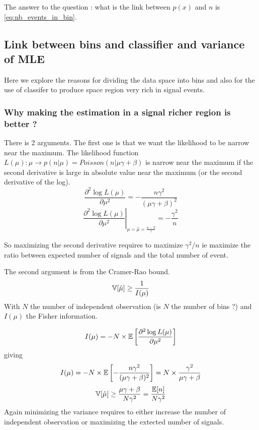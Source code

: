 The answer to the question : what is the link between $p(x)$ and $n$ is \autoref{eq:nb_events_in_bin}.





\subsection{Link between bins and classifier and variance of MLE} %
\label{sub:link_between_bins_and_classifier_and_variance_of_mle}

Here we explore the reasons for dividing the data space into bins and also for the use of classifer to produce space region very rich in signal events.


\subsubsection{Why making the estimation in a signal richer region is better ?}

There is 2 arguments.
The first one is that we want the likelihood to be narrow near the maximum.
The likelihood function $L(\mu) : \mu \to p(n|\mu) = Poisson(n|\mu\gamma + \beta)$ is narrow near the maximum if the second derivative is large in absolute value near the maximum (or the second derivative of the log).
\begin{equation}
    \frac{\partial^2 \log L(\mu)}{\partial \mu^2} = -\frac{n \gamma^2}{(\mu\gamma + \beta)^2}
\end{equation}
\begin{equation}
    \left . \frac{\partial^2 \log L(\mu)}{\partial \mu^2}  \right |_{\mu=\hat \mu = \frac{n-\beta}{\gamma}} = -\frac{\gamma^2}{n}
\end{equation}

So maximizing the second derivative requires to maximize $\gamma^2 / n$ ie maximize the ratio between expected number of signals and the total number of event.

The second argument is from the Cramer-Rao bound\needcite.
\begin{equation}
    \mathbb{V}[\hat \mu] \geq \frac{1}{I(\mu)}
\end{equation}
With $N$ the number of independent observation (is $N$ the number of bins ?) and $I(\mu)$ the Fisher information.

\begin{equation}
    I(\mu) = - N \times \mathbb{E}\left [\frac{\partial^2 \log L(\mu)}{\partial \mu^2} \right ]
\end{equation}
giving 
\begin{equation}
    I(\mu) = - N \times \mathbb{E}\left [-\frac{n \gamma^2}{(\mu\gamma + \beta)^2} \right ] = N \times \frac{\gamma^2}{\mu\gamma + \beta}
\end{equation}
\begin{equation}
    \mathbb{V}[\hat \mu] \geq  \frac{\mu\gamma + \beta}{N\gamma^2} = \frac{\mathbb{E}[n]}{N\gamma^2}
\end{equation}
Again minimizing the variance requires to either increase the number of independent observation or maximizing the extected number of signals.

